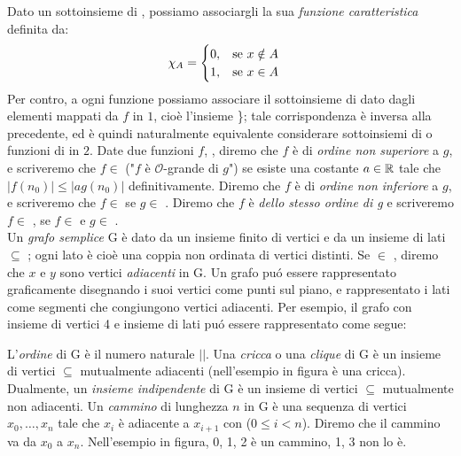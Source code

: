 Dato un sottoinsieme  di , possiamo associargli la sua \textit{funzione caratteristica}  definita da:
\begin{equation}
    \chi_A = 
    \begin{cases}
        0, \hspace{3mm} \textnormal{se } x \notin A \\
        1, \hspace{3mm} \textnormal{se } x \in A \\
    \end{cases}
\end{equation}
Per contro, a ogni funzione  possiamo associare il sottoinsieme di  dato dagli elementi mappati da $f$ in $1$, cioè l'insieme \}; tale corrispondenza è inversa alla precedente, ed è quindi naturalmente equivalente considerare sottoinsiemi di  o funzioni di  in $2$.
Date due funzioni $f$, , diremo che $f$ è di \textit{ordine non superiore} a $g$, e scriveremo che $f \in$  ("$f$ è $\mathcal{O}$-grande di $g$") se esiste una costante $a \in \mathbb{R}$ tale che $|f(n_0)| \leq |a g(n_0)|$ definitivamente. Diremo che $f$ è di \textit{ordine non inferiore} a $g$, e scriveremo che $f \in$  se $g \in$ . Diremo che $f$ è \textit{dello stesso ordine di g} e scriveremo $f \in$ , se $f \in$  e $g \in$ .\\
Un \textit{grafo semplice} G è dato da un insieme finito di vertici  e da un insieme di lati  $\subseteq$ ; ogni lato è cioè una coppia non ordinata di vertici distinti. Se  $\in$ , diremo che $x$ e $y$ sono vertici \textit{adiacenti} in G. Un grafo puó essere rappresentato graficamente disegnando i suoi vertici come punti sul piano, e rappresentato i lati come segmenti che congiungono vertici adiacenti. Per esempio, il grafo con insieme di vertici 4 e insieme di lati   puó essere rappresentato come segue:

L'\textit{ordine} di G è il numero naturale $|$$|$. Una \textit{cricca} o una \textit{clique} di G è un insieme di vertici  $\subseteq$  mutualmente adiacenti (nell'esempio in figura  è una cricca). Dualmente, un \textit{insieme indipendente} di G è un insieme di vertici  $\subseteq$  mutualmente non adiacenti. Un \textit{cammino} di lunghezza $n$ in G è una sequenza di vertici $x_0, \dots, x_{n}$ tale che $x_i$ è adiacente a $x_{i + 1}$ con ($0 \leq i < n$). Diremo che il cammino va da $x_0$ a $x_{n}$. Nell'esempio in figura, 0, 1, 2 è un cammino, 1, 3 non lo è.\\

